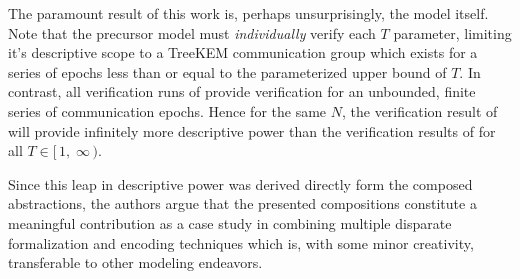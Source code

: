 \documentclass[runningheads]{llncs}
\newcommand{\NumericRangeOpenR}[2]{\ensuremath{[\,#1,\; #2\,)}\xspace}
\begin{document}
The paramount result of this work is, perhaps unsurprisingly, the model  itself.
Note that the precursor model  must \emph{individually} verify each $T$ parameter, limiting it's descriptive scope to a TreeKEM communication group which exists for a series of epochs less than or equal to the parameterized upper bound of $T$.
In contrast, all verification runs of   provide verification for an unbounded, finite series of communication epochs.
Hence for the same $N$, the verification result of  will provide infinitely more descriptive power than the verification results of  for all $T \in \NumericRangeOpenR{1}{\infty}$. %

Since this leap in descriptive power was derived directly form the composed abstractions, the authors argue that the presented compositions constitute a meaningful contribution as a case study in combining multiple disparate formalization and encoding techniques which is, with some minor creativity, transferable to other modeling endeavors.
\end{document}
